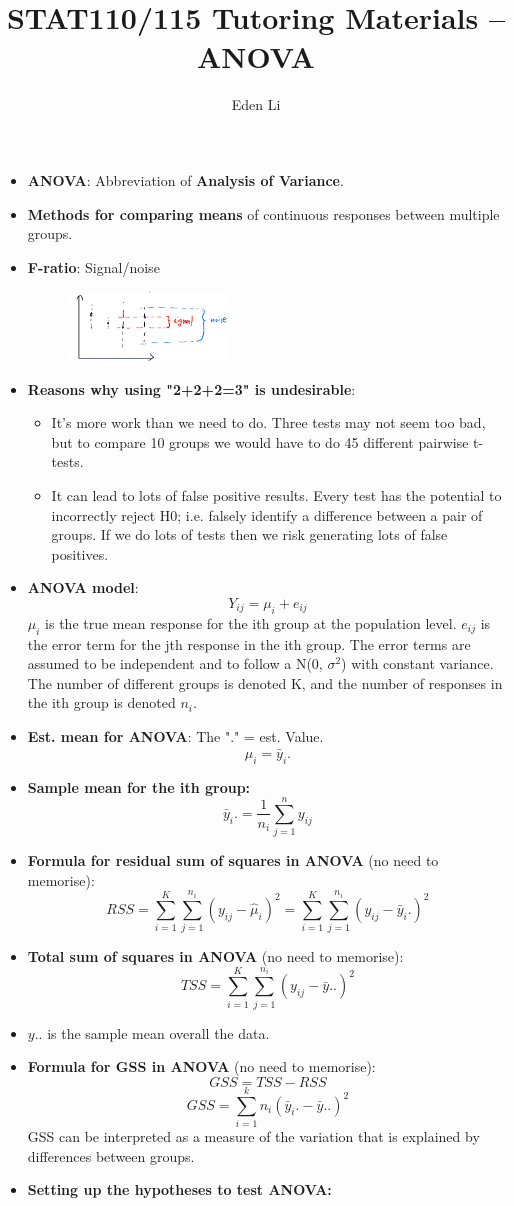 \documentclass[12pt]{article}
\author{Eden Li}
\title{STAT110/115 Tutoring Materials – ANOVA}
\date{}
\begin{document}
\pagestyle{fancy}

\begin{itemize}
\item \textbf{ANOVA}: Abbreviation of \textbf{Analysis of Variance}.
\item \textbf{Methods for comparing means} of continuous responses between multiple groups.
\item \textbf{F-ratio}: Signal/noise
\begin{figure}[H]
    \centering
    \includegraphics[width=0.4\textwidth]{anova.jpg}
\end{figure}
\item \textbf{Reasons why using "2+2+2=3" is undesirable}:
    \begin{itemize}
    \item It's more work than we need to do. Three tests may not seem too bad, but to compare 10 groups we would have to do 45 different pairwise t-tests.
    \item It can lead to lots of false positive results. Every test has the potential to incorrectly reject H0; i.e. falsely identify a difference between a pair of groups. If we do lots of tests then we risk generating lots of false positives.
    \end{itemize}
\item \textbf{ANOVA model}: 
$$Y_{ij}=\mu_i+e_{ij}$$
$\mu_i$ is the true mean response for the ith group at the population level. $e_{ij}$ is the error term for the jth response in the ith group. The error terms are assumed to be independent and to follow a N(0, $\sigma^2$) with constant variance. The number of different groups is denoted K, and the number of responses in the ith group is denoted $n_i$.
\item \textbf{Est. mean for ANOVA}: The "." = est. Value.
$$\hat{\mu}_i = \bar{y}_i.$$
\item \textbf{Sample mean for the ith group:}
$$\bar{y}_i.=\frac{1}{n_i}\sum_{j=1}^{n}y_{ij}$$
\item \textbf{Formula for residual sum of squares in ANOVA} (no need to memorise):
$$RSS=\sum_{i=1}^{K}\sum_{j=1}^{n_i}(y_{ij}-\hat{\mu}_i)^2=\sum_{i=1}^{K}\sum_{j=1}^{n_i}(y_{ij}-\bar{y}_i.)^2$$
\item \textbf{Total sum of squares in ANOVA} (no need to memorise):
$$TSS=\sum_{i=1}^{K}\sum_{j=1}^{n_i}(y_{ij}-\bar{y}..)^2$$
\item \textbf{$y..$} is the sample mean overall the data.
\item \textbf{Formula for GSS in ANOVA} (no need to memorise): 
$$GSS = TSS - RSS$$ 
$$GSS = \sum_{i=1}^{k}n_i(\bar{y}_i.-\bar{y}..)^2$$
GSS can be interpreted as a measure of the variation that is explained by differences between groups.
\item \textbf{Setting up the hypotheses to test ANOVA:}


\end{itemize}
\end{document}
